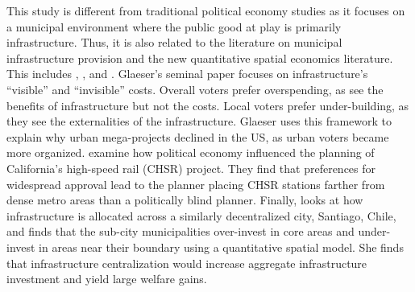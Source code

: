 This study is different from traditional political economy studies as it focuses on a municipal environment where the public good at play is primarily infrastructure. 
Thus, it is also related to the literature on municipal infrastructure provision and the new quantitative spatial economics literature.
This includes \cite{Glaeser2018political}, \cite{Fajgelbaum2023}, and \cite{bordeu2023commuting}.
Glaeser's seminal paper focuses on infrastructure's ``visible'' and ``invisible'' costs.
Overall voters prefer overspending, as see the benefits of infrastructure but not the costs.
Local voters prefer under-building, as they see the externalities of the infrastructure.
Glaeser uses this framework to explain why urban mega-projects declined in the US, as urban voters became more organized.
\cite{Fajgelbaum2023} examine how political economy influenced the planning of California's high-speed rail (CHSR) project.
They find that preferences for widespread approval lead to the planner placing CHSR stations farther from dense metro areas than a politically blind planner.
Finally, \cite{bordeu2023commuting} looks at how infrastructure is allocated across a similarly decentralized city, Santiago, Chile, and finds that the sub-city municipalities over-invest in core areas and under-invest in areas near their boundary using a quantitative spatial model.
She finds that infrastructure centralization would increase aggregate infrastructure investment  and yield large welfare gains.